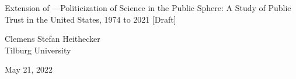 \begin{titlepage}
\begin{center}

	\vspace*{\fill}
	
	\LARGE{Extension of \citet{gauchat-2012}---Politicization of Science in the Public Sphere: A Study of Public Trust in the United States, 1974 to 2021 [Draft]}
	
	\vspace{1.5cm}	
	
	\large{
		Clemens Stefan Heithecker \\
		Tilburg University
	}
	
	\vspace{1cm}
	
	\large{May 21, 2022}
	
	\vfill

\end{center}
\end{titlepage}
